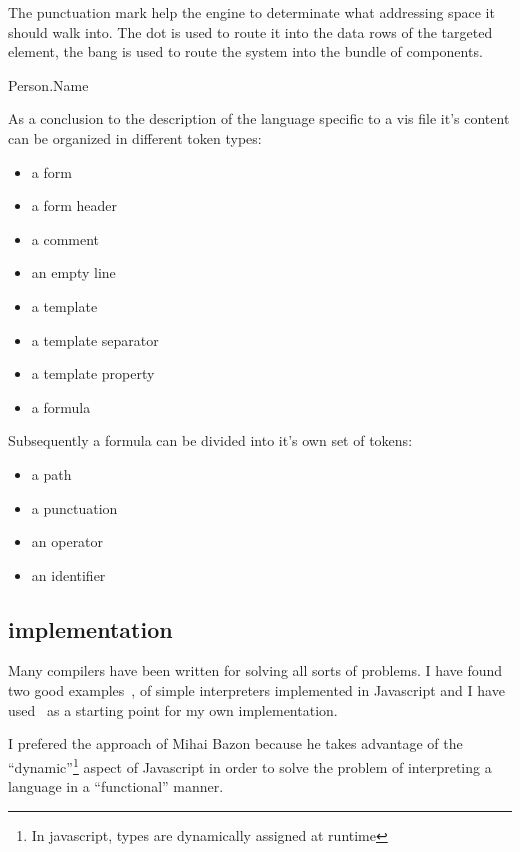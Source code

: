 The punctuation mark help the engine to determinate what addressing space it should walk into. The dot is used to route it into the data rows of the targeted element, the bang is used to route the system into the bundle of components.

Person.Name


As a conclusion to the description of the language specific to a vis file it's content can be organized in different token types:
\begin{itemize}
    \item a form
    \item a form header
    \item a comment
    \item an empty line
    \item a template
    \item a template separator
    \item a template property
    \item a formula
\end{itemize}

Subsequently a formula can be divided into it's own set of tokens:
\begin{itemize}
    \item a path
    \item a punctuation
    \item an operator
    \item an identifier
\end{itemize}



\subsection{implementation}

Many compilers have been written for solving all sorts of problems. I have found two good examples~\cite{bazon16},\cite{crockford2007} of simple interpreters implemented in Javascript and I have used~\cite{bazon16} as a starting point for my own implementation.

I prefered the approach of Mihai Bazon because he takes advantage of the ``dynamic''\footnote{In javascript, types are dynamically assigned at runtime} aspect of Javascript in order to solve the problem of interpreting a language in a ``functional'' manner.



